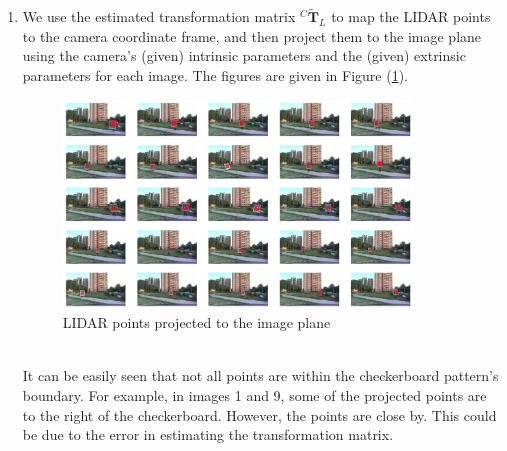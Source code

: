 \documentclass[10pt]{article}
\newcommand{\figref}[1]{Figure (\ref{fig:#1})}
\begin{document}
\begin{enumerate}
        \item We use the estimated transformation matrix $^{C} \mathbf{\tilde{T}}_{L}$ to
        map the LIDAR points to the camera coordinate frame, and then project them to
        the image plane using the camera's (given) intrinsic parameters and the (given)
        extrinsic parameters for each image. The figures are given in
        \figref{lidar-projection}.
        \begin{figure}[htbp]
            \begin{center}
                \includegraphics[width=0.875\textwidth]{Assets/Question-5/projection.png}
                \caption{LIDAR points projected to the image plane}
                \label{fig:lidar-projection}
            \end{center}
        \end{figure} \\
        It can be easily seen that not all points are within the checkerboard pattern's
        boundary. For example, in images 1 and 9, some of the projected points are to the
        right of the checkerboard. However, the points are close by. This could be due to
        the error in estimating the transformation matrix.


\end{enumerate}
\end{document}
